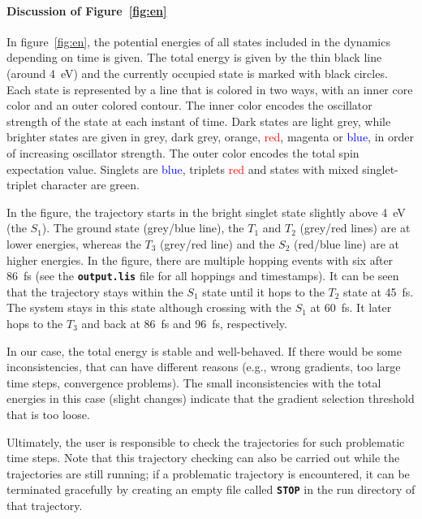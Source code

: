 \documentclass[a4paper,11pt,DIV=15,openany]{scrbook}
\newcommand{\ttt}[1]{\textbf{\texttt{#1}}}
\begin{document}
\paragraph{Discussion of Figure~\ref{fig:en}}

In figure~\ref{fig:en}, the potential energies of all states included in the dynamics depending on time is given. 
The total energy is given by the thin black line (around 4~eV) and the currently occupied state is marked with black circles. 
Each state is represented by a line that is colored in two ways, with an inner core color and an outer colored contour.
The inner color encodes the oscillator strength of the state at each instant of time. 
Dark states are \textcolor{black!20}{light grey}, while brighter states are given in \textcolor{black!40}{grey}, \textcolor{black!70}{dark grey}, \textcolor{red!60!green}{orange}, \textcolor{red}{red}, \textcolor{red!50!blue}{magenta} or \textcolor{blue}{blue}, in order of increasing oscillator strength. 
The outer color encodes the total spin expectation value. 
Singlets are \textcolor{blue}{blue}, triplets \textcolor{red}{red} and states with mixed singlet-triplet character are \textcolor{green!90!black}{green}. 

In the figure, the trajectory starts in the bright singlet state slightly above 4~eV (the $S_1$).
The ground state (grey/blue line), the $T_1$ and $T_2$ (grey/red lines) are at lower energies, whereas the $T_3$ (grey/red line) and the $S_2$ (red/blue line) are at higher energies.
In the figure, there are multiple hopping events with six after 86~fs (see the \ttt{output.lis} file for all hoppings and timestamps).
It can be seen that the trajectory stays within the $S_1$ state until it hops to the $T_2$ state at 45~fs. 
The system stays in this state although crossing with the $S_1$ at 60~fs. It later hops to the $T_3$ and back at 86~fs and 96~fs, respectively.

In our case, the total energy is stable and well-behaved. If there would be some inconsistencies, that can have different reasons (e.g., wrong gradients, too large time steps, convergence problems). The small inconsistencies with the total energies in this case (slight changes) indicate that the gradient selection threshold that is too loose. 

Ultimately, the user is responsible to check the trajectories for such problematic time steps.
Note that this trajectory checking can also be carried out while the trajectories are still running; if a problematic trajectory is encountered, it can be terminated gracefully by creating an empty file called \ttt{STOP} in the run directory of that trajectory.
\end{document}
